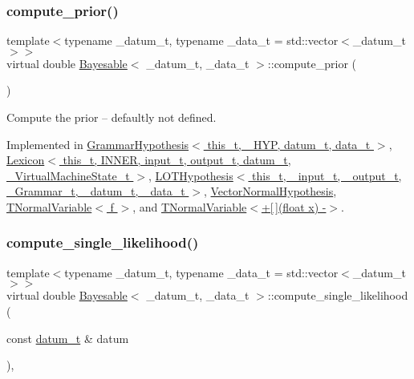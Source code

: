 \subsubsection{\texorpdfstring{compute\+\_\+prior()}{compute\_prior()}}
{\footnotesize\ttfamily template$<$typename \+\_\+datum\+\_\+t, typename \+\_\+data\+\_\+t = std\+::vector$<$\+\_\+datum\+\_\+t$>$$>$ \\
virtual double \hyperlink{class_bayesable}{Bayesable}$<$ \+\_\+datum\+\_\+t, \+\_\+data\+\_\+t $>$\+::compute\+\_\+prior (\begin{DoxyParamCaption}{ }\end{DoxyParamCaption})\hspace{0.3cm}{\ttfamily [pure virtual]}}



Compute the prior -- defaultly not defined. 



Implemented in \hyperlink{class_grammar_hypothesis_a8ad537345ab55b581825b89c9b2cfad3}{Grammar\+Hypothesis$<$ this\+\_\+t, \+\_\+\+H\+Y\+P, datum\+\_\+t, data\+\_\+t $>$}, \hyperlink{class_lexicon_a73e4205ac7b0e6f4f207e5d71dea1910}{Lexicon$<$ this\+\_\+t, I\+N\+N\+E\+R, input\+\_\+t, output\+\_\+t, datum\+\_\+t, \+\_\+\+Virtual\+Machine\+State\+\_\+t $>$}, \hyperlink{class_l_o_t_hypothesis_a32135631f7311a9a4a5a43c3f2ddfd6b}{L\+O\+T\+Hypothesis$<$ this\+\_\+t, \+\_\+input\+\_\+t, \+\_\+output\+\_\+t, \+\_\+\+Grammar\+\_\+t, \+\_\+datum\+\_\+t, \+\_\+data\+\_\+t $>$}, \hyperlink{class_vector_normal_hypothesis_a2cf8e90e2d6e164e4bd86702ed83a9d9}{Vector\+Normal\+Hypothesis}, \hyperlink{class_t_normal_variable_a5cb6223529b451239b505b3e5dbdd605}{T\+Normal\+Variable$<$ f $>$}, and \hyperlink{class_t_normal_variable_a5cb6223529b451239b505b3e5dbdd605}{T\+Normal\+Variable$<$+\mbox{[}$\,$\mbox{]}(float x) -\/$>$}.

\mbox{\label{class_bayesable_a87d195bfe5cdf6d293dae5fc01ae2e6c}} 
\subsubsection{\texorpdfstring{compute\+\_\+single\+\_\+likelihood()}{compute\_single\_likelihood()}}
{\footnotesize\ttfamily template$<$typename \+\_\+datum\+\_\+t, typename \+\_\+data\+\_\+t = std\+::vector$<$\+\_\+datum\+\_\+t$>$$>$ \\
virtual double \hyperlink{class_bayesable}{Bayesable}$<$ \+\_\+datum\+\_\+t, \+\_\+data\+\_\+t $>$\+::compute\+\_\+single\+\_\+likelihood (\begin{DoxyParamCaption}\item[{const \hyperlink{class_bayesable_a9f1a6c0cd7855550fa10b1a8f13a5867}{datum\+\_\+t} \&}]{datum }\end{DoxyParamCaption})\hspace{0.3cm}{\ttfamily [inline]}, {\ttfamily [virtual]}}



